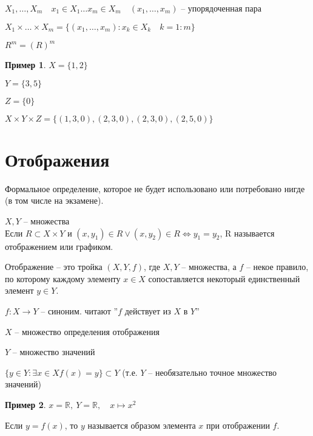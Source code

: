\documentclass{book}
\newcommand\R{\ensuremath{\mathbb{R}}}
\theoremstyle{definition}
\newtheorem*{example}{Пример}
\begin{document}
        $X_1, \ldots, X_m\quad x_1\in X_1 \ldots x_m\in X_m\quad (x_{1}, \ldots, x_{m} )$ -- упорядоченная пара

        \begin{definition}

            $X_1\times \ldots\times X_m = \{(x_1, \ldots, x_{m} ):x_k\in X_k\quad k = 1:m\}$

            $R^m = (R)^m$
        \end{definition}

        \begin{example}
            $X = \{1,2\}$

            $Y = \{3,5\}$

            $Z = \{0\}$

            $X\times Y\times Z = \{(1,3,0),(2,3,0),(2,3,0),(2,5,0)\}$
        \end{example}

        \section{Отображения}
        Формальное определение, которое не будет использовано или потребовано нигде (в том числе на экзамене).
        \begin{definition}
           $X,Y$ -- множества\\
           Если $R\subset X\times Y$ и $(x,y_1)\in R \vee (x,y_2)\in R \iff y_1=y_2$, R называется отображением или графиком.
    \end{definition}
    
    \begin{definition}
        Отображение -- это тройка $(X,Y,f)$, где $X,Y$ -- множества, а $f$ -- некое правило, по которому каждому элементу $x\in X$ сопоставляется некоторый единственный элемент $y\in Y$.
            
        $f:X\to Y$ -- синоним. читают ''$f$ действует из $X$ в $Y$''

        $X$ -- множество определения отображения

        $Y$ -- множество значений

        $\{y\in Y: \exists x\in X f(x) = y\}\subset Y$ (т.е. $Y$ -- необязательно точное множество значений)
    \end{definition}
    
    \begin{example}
        $x = \R,\ Y = \R, \quad x\mapsto x^2$

        Если $y=f(x)$, то $y$ называется образом элемента $x$ при отображении $f$.
    \end{example}
\end{document}
